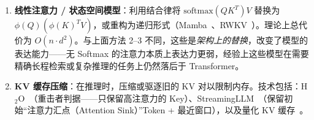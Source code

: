 \begin{enumerate}
  \item \textbf{线性注意力 / 状态空间模型}：利用结合律将 $\text{softmax}(QK^T)V$ 替换为 $\phi(Q)(\phi(K)^T V)$，或重构为递归形式（Mamba~\cite{gu2023mamba}、RWKV~\cite{peng2023rwkv}）。理论上总代价为 $O(n \cdot d^2)$。与上面方法 2--3 不同，这些是\emph{架构上的替换}，改变了模型的表达能力——无 Softmax 的注意力本质上表达力更弱，经验上这些模型在需要精确长程检索或复杂推理的任务上仍然落后于 Transformer。
  \item \textbf{KV 缓存压缩}：在推理时，压缩或驱逐旧的 KV 对以限制内存。技术包括：H$_2$O~\cite{zhang2023h2o}（重击者判据——只保留高注意力的 Key）、StreamingLLM~\cite{xiao2024efficient}（保留初始``注意力汇点（Attention Sink）''Token + 最近窗口），以及量化 KV 缓存~\cite{liu2024kivi}。
\end{enumerate}

